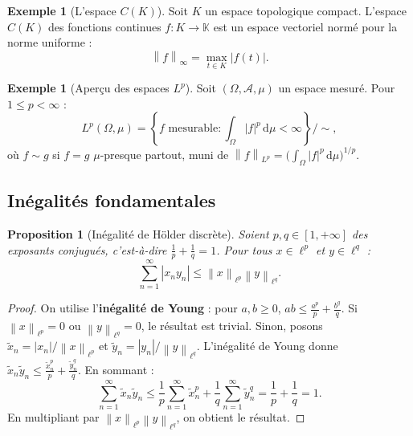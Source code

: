 \documentclass[a4paper,12pt]{book}
\newcommand{\K}{\mathbb{K}}
\newcommand{\dd}{\mathrm{d}}
\newcommand{\norm}[1]{\left\| #1 \right\|}
\newcommand{\abs}[1]{\left| #1 \right|}
\theoremstyle{definition}
\newtheorem{exemple}[definition]{Exemple}
\theoremstyle{plain}
\newtheorem{proposition}[definition]{Proposition}
\theoremstyle{remark}
\begin{document}
\begin{exemple}[L'espace $C(K)$]\label{ex:CK}
Soit $K$ un espace topologique compact. L'espace $C(K)$ des fonctions continues $f : K \to \K$ est un espace vectoriel normé pour la norme uniforme :
\[
    \norm{f}_\infty = \max_{t \in K} \abs{f(t)}.
\]
\end{exemple}

\begin{exemple}[Aperçu des espaces $L^p$]\label{ex:Lp-preview}
Soit $(\Omega, \mathcal{A}, \mu)$ un espace mesuré. Pour $1 \leq p < \infty$ :
\[
    L^p(\Omega, \mu) = \left\{ f \text{ mesurable} : \int_\Omega \abs{f}^p \, \dd\mu < \infty \right\} \Big/ \sim,
\]
où $f \sim g$ si $f = g$ $\mu$-presque partout, muni de $\norm{f}_{L^p} = \bigl( \int_\Omega \abs{f}^p \, \dd\mu \bigr)^{1/p}$.
\end{exemple}

\subsection{Inégalités fondamentales}

\begin{proposition}[Inégalité de Hölder discrète]\label{prop:holder-discret}
Soient $p, q \in [1, +\infty]$ des exposants conjugués, c'est-à-dire $\frac{1}{p} + \frac{1}{q} = 1$. Pour tous $x \in \ell^p$ et $y \in \ell^q$ :
\[
    \sum_{n=1}^{\infty} \abs{x_n y_n} \leq \norm{x}_{\ell^p} \norm{y}_{\ell^q}.
\]
\end{proposition}

\begin{proof}
On utilise l'\textbf{inégalité de Young} : pour $a, b \geq 0$, $ab \leq \frac{a^p}{p} + \frac{b^q}{q}$. Si $\norm{x}_{\ell^p} = 0$ ou $\norm{y}_{\ell^q} = 0$, le résultat est trivial. Sinon, posons $\tilde{x}_n = \abs{x_n}/\norm{x}_{\ell^p}$ et $\tilde{y}_n = \abs{y_n}/\norm{y}_{\ell^q}$. L'inégalité de Young donne $\tilde{x}_n \tilde{y}_n \leq \frac{\tilde{x}_n^p}{p} + \frac{\tilde{y}_n^q}{q}$. En sommant :
\[
    \sum_{n=1}^{\infty} \tilde{x}_n \tilde{y}_n \leq \frac{1}{p} \sum_{n=1}^{\infty} \tilde{x}_n^p + \frac{1}{q} \sum_{n=1}^{\infty} \tilde{y}_n^q = \frac{1}{p} + \frac{1}{q} = 1.
\]
En multipliant par $\norm{x}_{\ell^p}\norm{y}_{\ell^q}$, on obtient le résultat.
\end{proof}
\end{document}
